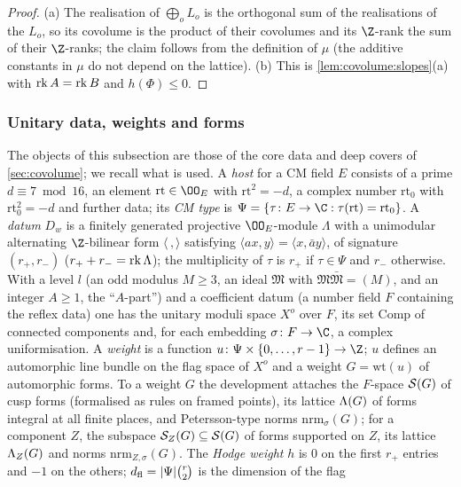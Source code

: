 \begin{proof}
(a) The realisation of $\bigoplus_oL_o$ is the orthogonal sum of the realisations of the $L_o$, so its
covolume is the product of their covolumes and its $\Z$-rank the sum of their $\Z$-ranks; the claim
follows from the definition of $\mu$ (the additive constants in $\mu$ do not depend on the lattice).
(b) This is \cref{lem:covolume:slopes}(a) with $\operatorname{rk} A=\operatorname{rk} B$ and $h(\Phi)\le0$.
\end{proof}

\subsubsection*{Unitary data, weights and forms}
The objects of this subsection are those of the core data and deep covers of \cref{sec:covolume}; we
recall what is used. A \emph{host} for a CM field $E$ consists of a prime $d\equiv7\bmod16$, an element
$\mathrm{rt}\in\OO_E$ with $\mathrm{rt}^2=-d$, a complex number $\mathrm{rt}_0$ with
$\mathrm{rt}_0^2=-d$ and further data; its \emph{CM type} is
$\Psi=\{\tau\colon E\to\C:\tau(\mathrm{rt})=\mathrm{rt}_0\}$. A \emph{datum} $D_w$ is a finitely
generated projective $\OO_E$-module $\Lambda$ with a unimodular alternating $\Z$-bilinear form
$\langle\,,\rangle$ satisfying $\langle ax,y\rangle=\langle x,\bar ay\rangle$, of signature
$(r_+,r_-)$ ($r_++r_-=\operatorname{rk}\Lambda$); the multiplicity of $\tau$ is $r_+$ if $\tau\in\Psi$ and
$r_-$ otherwise. With a level $l$ (an odd modulus $M\ge3$, an ideal $\mathfrak M$ with
$\mathfrak M\bar{\mathfrak M}=(M)$, and an integer $A\ge1$, the ``$A$-part'') and a coefficient datum
(a number field $F$ containing the reflex data) one has the unitary moduli space $X^o$ over $F$, its
set $\mathrm{Comp}$ of connected components and, for each embedding $\sigma\colon F\to\C$, a complex
uniformisation. A \emph{weight} is a function $u\colon\Psi\times\{0,\dots,r-1\}\to\Z$; $u$ defines an
automorphic line bundle on the flag space of $X^o$ and a weight $G=\mathrm{wt}(u)$ of automorphic
forms. To a weight $G$ the development attaches the $F$-space $\mathcal S(G)$ of cusp forms (formalised
as rules on framed points), its lattice $\Lambda(G)$ of forms integral at all finite places, and
Petersson-type norms $\mathrm{nrm}_\sigma(G)$; for a component $Z$, the subspace
$\mathcal S_Z(G)\subseteq\mathcal S(G)$ of forms supported on $Z$, its lattice
$\Lambda_Z(G)$ and norms $\mathrm{nrm}_{Z,\sigma}(G)$. The \emph{Hodge weight} $h$ is $0$ on the
first $r_+$ entries and $-1$ on the others; $d_{\mathrm{fl}}=|\Psi|\binom r2$ is the dimension of the flag

